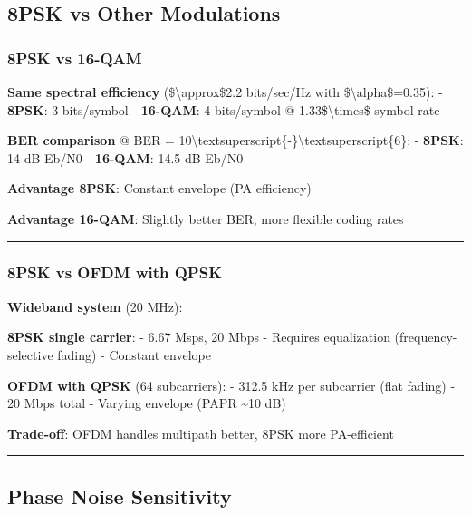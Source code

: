 \subsection{8PSK vs Other Modulations}\label{psk-vs-other-modulations}

\subsubsection{8PSK vs 16-QAM}\label{psk-vs-16-qam}

\textbf{Same spectral efficiency} (\$\textbackslash approx\$2.2
bits/sec/Hz with \$\textbackslash alpha\$=0.35): - \textbf{8PSK}: 3
bits/symbol - \textbf{16-QAM}: 4 bits/symbol @
1.33\$\textbackslash times\$ symbol rate

\textbf{BER comparison} @ BER =
10\textbackslash textsuperscript\{-\}\textbackslash textsuperscript\{6\}:
- \textbf{8PSK}: 14 dB Eb/N0 - \textbf{16-QAM}: 14.5 dB Eb/N0

\textbf{Advantage 8PSK}: Constant envelope (PA efficiency)

\textbf{Advantage 16-QAM}: Slightly better BER, more flexible coding
rates

\begin{center}\rule{0.5\linewidth}{0.5pt}\end{center}

\subsubsection{8PSK vs OFDM with QPSK}\label{psk-vs-ofdm-with-qpsk}

\textbf{Wideband system} (20 MHz):

\textbf{8PSK single carrier}: - 6.67 Msps, 20 Mbps - Requires
equalization (frequency-selective fading) - Constant envelope

\textbf{OFDM with QPSK} (64 subcarriers): - 312.5 kHz per subcarrier
(flat fading) - 20 Mbps total - Varying envelope (PAPR \textasciitilde10
dB)

\textbf{Trade-off}: OFDM handles multipath better, 8PSK more
PA-efficient

\begin{center}\rule{0.5\linewidth}{0.5pt}\end{center}

\subsection{Phase Noise Sensitivity}\label{phase-noise-sensitivity}

